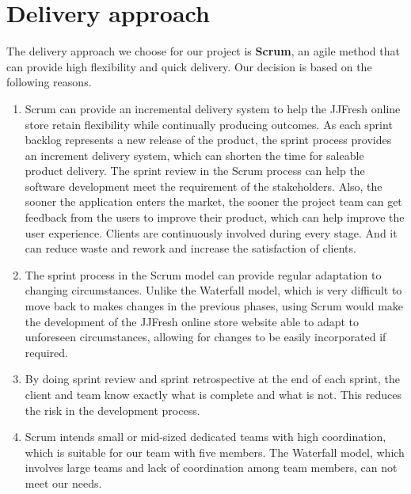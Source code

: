 \documentclass{report}
\begin{document}
\section{Delivery approach}
\label{sec:deliveryApproach}
The delivery approach we choose for our project is \textbf{Scrum}, an agile method that can provide high flexibility and quick delivery. Our decision is based on the following reasons.
\begin{enumerate}
  \item Scrum can provide an incremental delivery system to help the JJFresh online store retain flexibility while continually producing outcomes. As each sprint backlog represents a new release of the product, the sprint process provides an increment delivery system, which can shorten the time for saleable product delivery. The sprint review in the Scrum process can help the software development meet the requirement of the stakeholders. Also, the sooner the application enters the market, the sooner the project team can get feedback from the users to improve their product, which can help improve the user experience. Clients are continuously involved during every stage. And it can reduce waste and rework and increase the satisfaction of clients.
  \item The sprint process in the Scrum model can provide regular adaptation to changing circumstances. Unlike the Waterfall model, which is very difficult to move back to makes changes in the previous phases, using Scrum would make the development of the JJFresh online store website able to adapt to unforeseen circumstances, allowing for changes to be easily incorporated if required.
  \item By doing sprint review and sprint retrospective at the end of each sprint, the client and team know exactly what is complete and what is not. This reduces the risk in the development process.
  \item Scrum intends small or mid-sized dedicated teams with high coordination, which is suitable for our team with five members. The Waterfall model, which involves large teams and lack of coordination among team members, can not meet our needs.
\end{enumerate}
\end{document}
